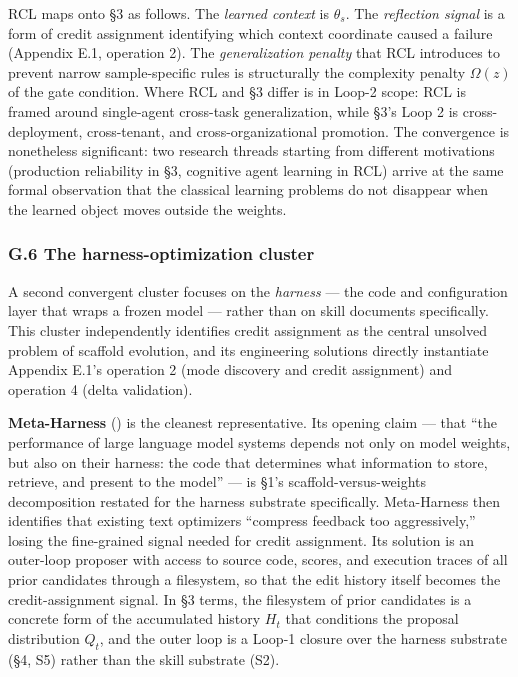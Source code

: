 \documentclass[
]{article}
\newcounter{none} %
\begin{document}
RCL maps onto §3 as follows. The \emph{learned context} is \(\theta_s\).
The \emph{reflection signal} is a form of credit assignment identifying
which context coordinate caused a failure (Appendix E.1, operation 2).
The \emph{generalization penalty} that RCL introduces to prevent narrow
sample-specific rules is structurally the complexity penalty
\(\Omega(z)\) of the gate condition. Where RCL and §3 differ is in
Loop-2 scope: RCL is framed around single-agent cross-task
generalization, while §3's Loop 2 is cross-deployment, cross-tenant, and
cross-organizational promotion. The convergence is nonetheless
significant: two research threads starting from different motivations
(production reliability in §3, cognitive agent learning in RCL) arrive
at the same formal observation that the classical learning problems do
not disappear when the learned object moves outside the weights.

\subsubsection{G.6 The harness-optimization
cluster}\label{g.6-the-harness-optimization-cluster}

A second convergent cluster focuses on the \emph{harness} --- the code
and configuration layer that wraps a frozen model --- rather than on
skill documents specifically. This cluster independently identifies
credit assignment as the central unsolved problem of scaffold evolution,
and its engineering solutions directly instantiate Appendix E.1's
operation 2 (mode discovery and credit assignment) and operation 4
(delta validation).

\textbf{Meta-Harness} () is the cleanest representative. Its opening claim --- that ``the
performance of large language model systems depends not only on model
weights, but also on their harness: the code that determines what
information to store, retrieve, and present to the model'' --- is §1's
scaffold-versus-weights decomposition restated for the harness substrate
specifically. Meta-Harness then identifies that existing text optimizers
``compress feedback too aggressively,'' losing the fine-grained signal
needed for credit assignment. Its solution is an outer-loop proposer
with access to source code, scores, and execution traces of all prior
candidates through a filesystem, so that the edit history itself becomes
the credit-assignment signal. In §3 terms, the filesystem of prior
candidates is a concrete form of the accumulated history \(H_t\) that
conditions the proposal distribution \(Q_t\), and the outer loop is a
Loop-1 closure over the harness substrate (§4, S5) rather than the skill
substrate (S2).
\end{document}
